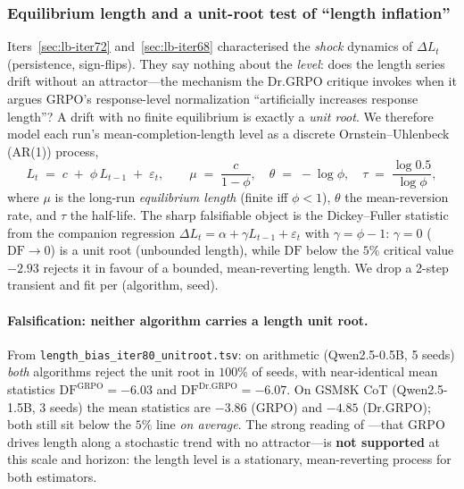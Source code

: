 \documentclass{article}
\begin{document}
\subsubsection{Equilibrium length and a unit-root test of ``length inflation''}\label{sec:lb-iter80}

Iters~\ref{sec:lb-iter72} and~\ref{sec:lb-iter68} characterised the
\emph{shock} dynamics of $\Delta L_t$ (persistence, sign-flips). They say
nothing about the \emph{level}: does the length series drift without an
attractor---the mechanism the Dr.GRPO critique
\citep{tong2025drgrpo} invokes when it argues GRPO's response-level
normalization ``artificially increases response length''? A drift with no
finite equilibrium is exactly a \emph{unit root}. We therefore model each
run's mean-completion-length level as a discrete Ornstein--Uhlenbeck (AR(1))
process,
\begin{equation}\label{eq:lb80-ou}
L_t \;=\; c \;+\; \phi\, L_{t-1} \;+\; \varepsilon_t,
\qquad
\mu \;=\; \frac{c}{1-\phi},\quad
\theta \;=\; -\log\phi,\quad
\tau \;=\; \frac{\log 0.5}{\log\phi},
\end{equation}
where $\mu$ is the long-run \emph{equilibrium length} (finite iff
$\phi<1$), $\theta$ the mean-reversion rate, and $\tau$ the half-life. The
sharp falsifiable object is the Dickey--Fuller statistic from the companion
regression $\Delta L_t = \alpha + \gamma L_{t-1} + \varepsilon_t$ with
$\gamma=\phi-1$: $\gamma=0$ ($\mathrm{DF}\!\to\!0$) is a unit root
(unbounded length), while $\mathrm{DF}$ below the $5\%$ critical value
$-2.93$ rejects it in favour of a bounded, mean-reverting length. We drop a
2-step transient and fit per (algorithm, seed).

\paragraph{Falsification: neither algorithm carries a length unit root.}
From \texttt{length\_bias\_iter80\_unitroot.tsv}: on arithmetic
(Qwen2.5-0.5B, 5 seeds) \emph{both} algorithms reject the unit root in
$100\%$ of seeds, with near-identical mean statistics
$\mathrm{DF}^{\mathrm{GRPO}}=-6.03$ and
$\mathrm{DF}^{\mathrm{Dr.GRPO}}=-6.07$. On GSM8K CoT (Qwen2.5-1.5B, 3 seeds)
the mean statistics are $-3.86$ (GRPO) and $-4.85$ (Dr.GRPO); both still sit
below the $5\%$ line \emph{on average}. The strong reading of
\citet{tong2025drgrpo}---that GRPO drives length along a stochastic trend
with no attractor---is \textbf{not supported} at this scale and horizon: the
length level is a stationary, mean-reverting process for both estimators.
\end{document}
